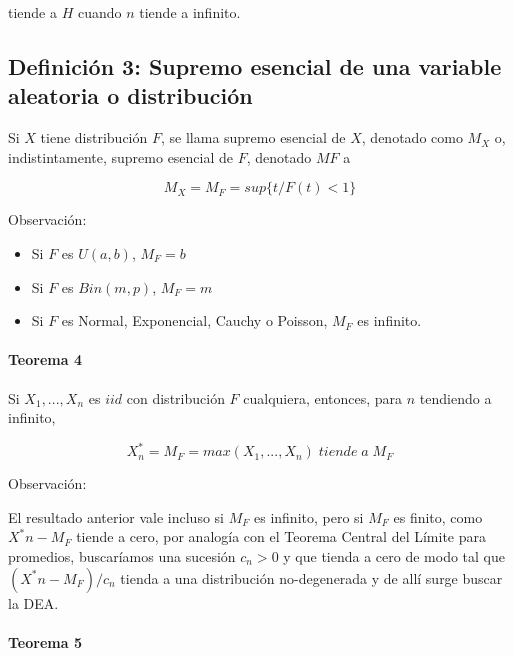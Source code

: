 \documentclass[
  oneside]{book}
\begin{document}
tiende a \(H\) cuando \(n\) tiende a infinito.

\hypertarget{definiciuxf3n-3-supremo-esencial-de-una-variable-aleatoria-o-distribuciuxf3n}{%
\subsection{Definición 3: Supremo esencial de una variable aleatoria o
distribución}\label{definiciuxf3n-3-supremo-esencial-de-una-variable-aleatoria-o-distribuciuxf3n}}

Si \(X\) tiene distribución \(F\), se llama supremo esencial de \(X\),
denotado como \(M_X\) o, indistintamente, supremo esencial de \(F\),
denotado \(MF\) a

\begin{equation}
M_X=M_F= sup\{t / F(t)<1\}\label{eq:Mx}
\end{equation}

Observación:

\begin{itemize}
\item Si $F$ es $U(a,b)$, $M_F=b$
\item Si $F$ es $Bin(m,p)$, $M_F=m$
\item Si $F$ es Normal, Exponencial, Cauchy o Poisson, $M_F$ es infinito.
\end{itemize}

\hypertarget{teorema-4}{%
\paragraph{Teorema 4}\label{teorema-4}}

Si \(X_1,...,X_n\) es \(iid\) con distribución \(F\) cualquiera,
entonces, para \(n\) tendiendo a infinito,

\begin{equation}
X^*_n=M_F= max(X_1,...,X_n)\;tiende\;a\;M_F\label{eq:Xast}
\end{equation}

Observación:

El resultado anterior vale incluso si \(M_F\) es infinito, pero si
\(M_F\) es finito, como \(X^*n - M_F\) tiende a cero, por analogía con
el Teorema Central del Límite para promedios, buscaríamos una sucesión
\(c_n>0\) y que tienda a cero de modo tal que \((X^*n- M_F )/ c_n\)
tienda a una distribución no-degenerada y de allí surge buscar la DEA.

\hypertarget{teorema-5}{%
\paragraph{Teorema 5}\label{teorema-5}}
\end{document}
